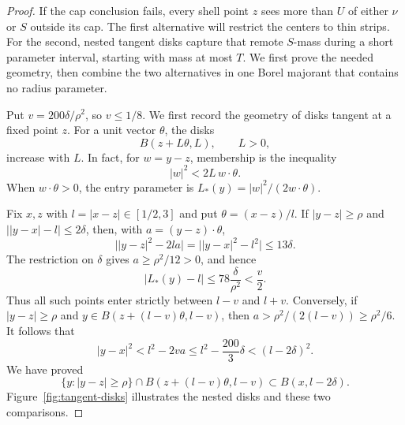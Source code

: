 \begin{proof}
If the cap conclusion fails, every shell point $z$ sees more than $U$
of either $\nu$ or $S$ outside its cap. The first alternative will
restrict the centers to thin strips. For the second, nested tangent
disks capture that remote $S$-mass during a short parameter interval,
starting with mass at most $T$.
We first prove the needed geometry, then combine the two alternatives
in one Borel majorant that contains no radius parameter.

Put $v=200\delta/\rho^2$, so $v\le1/8$. We first record the geometry
of disks tangent at a fixed point $z$. For a unit vector $\theta$, the
disks
\[
B(z+L\theta,L),\qquad L>0,
\]
increase with $L$. In fact, for $w=y-z$, membership is the inequality
\begin{equation}\label{eq:shell-entry}
|w|^2<2L\,w\cdot\theta.
\end{equation}
When $w\cdot\theta>0$, the entry parameter is
$L_*(y)=|w|^2/(2w\cdot\theta)$.

Fix $x,z$ with $l=|x-z|\in[1/2,3]$ and put
$\theta=(x-z)/l$. If $|y-z|\ge\rho$ and
$\bigl||y-x|-l\bigr|\le2\delta$, then, with
$a=(y-z)\cdot\theta$,
\[
\bigl||y-z|^2-2la\bigr|
 =\bigl||y-x|^2-l^2\bigr|\le13\delta.
\]
The restriction on $\delta$ gives
$a\ge\rho^2/12>0$, and hence
\begin{equation}\label{eq:shell-entry-window}
|L_*(y)-l|\le78\frac{\delta}{\rho^2}<\frac v2.
\end{equation}
Thus all such points enter strictly between $l-v$ and $l+v$.
Conversely, if $|y-z|\ge\rho$ and
$y\in B(z+(l-v)\theta,l-v)$, then
$a>\rho^2/(2(l-v))\ge\rho^2/6$. It follows that
\[
|y-x|^2<l^2-2va
 \le l^2-\frac{200}{3}\delta<(l-2\delta)^2.
\]
We have proved
\begin{equation}\label{eq:shell-earlier-interior}
\{y:|y-z|\ge\rho\}\cap B(z+(l-v)\theta,l-v)
       \subset B(x,l-2\delta).
\end{equation}
Figure~\ref{fig:tangent-disks} illustrates the nested disks and these
two comparisons.




\end{proof}
